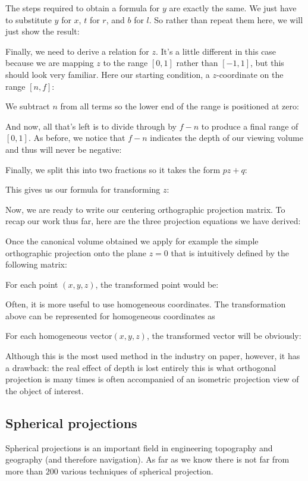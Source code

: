 	The steps required to obtain a formula for $y$ are exactly the same. We just have to substitute $y$ for $x$, $t$ for $r$, and $b$ for $l$. So rather than repeat them here, we will just show the result:
	
	Finally, we need to derive a relation for $z$. It's a little different in this case because we are mapping $z$ to the range $[0, 1]$ rather than $[-1, 1]$, but this should look very familiar. Here our starting condition, a $z$-coordinate on the range $[n, f]$:
	
	We subtract $n$ from all terms so the lower end of the range is positioned at zero:
	
	And now, all that's left is to divide through by $f - n$ to produce a final range of $[0, 1]$. As before, we notice that $f - n$ indicates the depth of our viewing volume and thus will never be negative:
	
	Finally, we split this into two fractions so it takes the form $pz + q$:
	
	This gives us our formula for transforming $z$:
	
	Now, we are ready to write our centering orthographic projection matrix. To recap our work thus far, here are the three projection equations we have derived:
	
	Once the canonical volume obtained we apply for example the simple orthographic projection onto the plane $z = 0$ that is intuitively defined by the following matrix:
	
	For each point $(x, y, z)$, the transformed point would be:
	
	Often, it is more useful to use homogeneous coordinates. The transformation above can be represented for homogeneous coordinates as
	
	For each homogeneous vector$(x,y,z)$, the transformed vector will be obviously:
	
	Although this is the most used method in the industry on paper, however, it has a drawback: the real effect of depth is lost entirely this is what orthogonal projection is many times is often accompanied of an isometric projection view of the object of interest.
	
	\pagebreak
	\subsection{Spherical projections}
	Spherical projections is an important field in engineering topography and geography (and therefore navigation). As far as we know there is not far from more than $200$ various techniques of spherical projection. 
	
